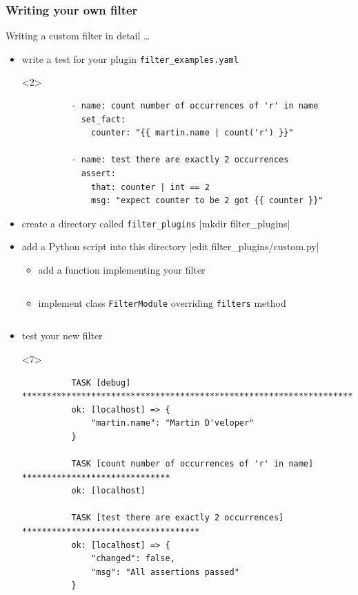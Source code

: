 \documentclass[pdf]{beamer}
\begin{document}
\begin{frame}[t,fragile]
  \frametitle{Writing your own filter}
  Writing a custom filter in detail \ldots
  \pause{}
  \begin{itemize}
    \item<+-> write a test for your plugin \texttt{filter\_examples.yaml}
      \begin{onlyenv}<2>
        \begin{verbatim}
          - name: count number of occurrences of 'r' in name
            set_fact:
              counter: "{{ martin.name | count('r') }}"

          - name: test there are exactly 2 occurrences
            assert:
              that: counter | int == 2
              msg: "expect counter to be 2 got {{ counter }}"
        \end{verbatim}
      \end{onlyenv}
    \item<+-> create a directory called \texttt{filter\_plugins}
       {|mkdir filter_plugins|}
    \item<+-> add a Python script into this directory
       {|edit filter_plugins/custom.py|}
      \begin{itemize}
        \item<+-> add a function implementing your filter
           {\inputminted[firstline=3,lastline=5]{python}{filter_plugins/custom.py}}
        \item<+-> implement class \texttt{FilterModule} overriding \texttt{filters} method
           {\inputminted[firstline=7,lastline=10]{python}{filter_plugins/custom.py}}
      \end{itemize}
    \item<+-> test your new filter
      \begin{onlyenv}<7>
        \begin{verbatim}
          TASK [debug] *******************************************************************
          ok: [localhost] => {
              "martin.name": "Martin D'veloper"
          }

          TASK [count number of occurrences of 'r' in name] ******************************
          ok: [localhost]

          TASK [test there are exactly 2 occurrences] ************************************
          ok: [localhost] => {
              "changed": false,
              "msg": "All assertions passed"
          }
        \end{verbatim}
      \end{onlyenv}
  \end{itemize}
\end{frame}
\end{document}
